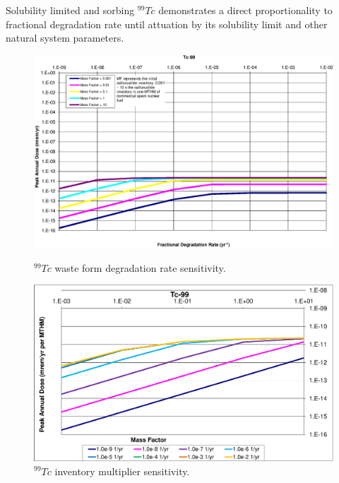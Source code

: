 Solubility limited and sorbing $^{99}Tc$ demonstrates a direct proportionality 
to fractional degradation rate until attuation by its solubility limit and other 
natural system parameters.  

\begin{figure}[ht!]
\begin{minipage}[b]{0.45\linewidth}

\centering
\includegraphics[width=\linewidth]{./chapters/nuclide_sensitivity/clay/WFDegAndInv/Tc-99.eps}
\caption{$^{99}Tc$ waste form degradation rate sensitivity.}
\label{fig:WFDegTc99}

\end{minipage}
\hspace{0.05\linewidth}
\begin{minipage}[b]{0.45\linewidth}

\includegraphics[width=\linewidth]{./chapters/nuclide_sensitivity/clay/WFDegAndInv/Tc-99-MF.eps}
\caption{$^{99}Tc$ inventory multiplier sensitivity.}
\label{fig:WFDegTc99MF}

\end{minipage}
\end{figure}
